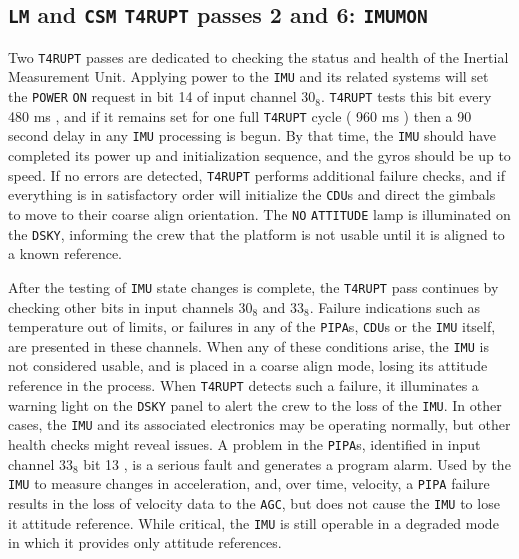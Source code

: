 \documentclass[refcap, oxford]{ahsan}
\begin{document}
\subsection{\texttt{LM} and \texttt{CSM} \texttt{T4RUPT} passes 2 and 6: \texttt{IMUMON}}
Two \texttt{T4RUPT} passes are dedicated to checking the status and health of the Inertial Measurement Unit. Applying power to the \texttt{IMU} and its related systems will set the \texttt{POWER} \texttt{ON} request in bit 14 of input channel $30_{8}$. \texttt{T4RUPT} tests this bit every 480 ms , and if it remains set for one full \texttt{T4RUPT} cycle ( 960 ms ) then a 90 second delay in any \texttt{IMU} processing is begun. By that time, the \texttt{IMU} should have completed its power up and initialization sequence, and the gyros should be up to speed. If no errors are detected, \texttt{T4RUPT} performs additional failure checks, and if everything is in satisfactory order will initialize the \texttt{CDU}s and direct the gimbals to move to their coarse align orientation. The \texttt{NO} \texttt{ATTITUDE} lamp is illuminated on the \texttt{DSKY}, informing the crew that the platform is not usable until it is aligned to a known reference.

After the testing of \texttt{IMU} state changes is complete, the \texttt{T4RUPT} pass continues by checking other bits in input channels $30_{8}$ and $33_{8}$. Failure indications such as temperature out of limits, or failures in any of the \texttt{PIPA}s, \texttt{CDU}s or the \texttt{IMU} itself, are presented in these channels. When any of these conditions arise, the \texttt{IMU} is not considered usable, and is placed in a coarse align mode, losing its attitude reference in the process. When \texttt{T4RUPT} detects such a failure, it illuminates a warning light on the \texttt{DSKY} panel to alert the crew to the loss of the \texttt{IMU}. In other cases, the \texttt{IMU} and its associated electronics may be operating normally, but other health checks might reveal issues. A problem in the \texttt{PIPA}s, identified in input channel $33_{8}$ bit 13 , is a serious fault and generates a program alarm. Used by the \texttt{IMU} to measure changes in acceleration, and, over time, velocity, a \texttt{PIPA} failure results in the loss of velocity data to the \texttt{AGC}, but does not cause the \texttt{IMU} to lose it attitude reference. While critical, the \texttt{IMU} is still operable in a degraded mode in which it provides only attitude references.
\end{document}
